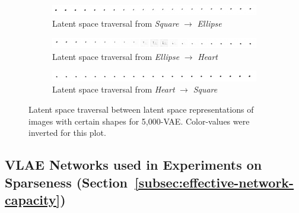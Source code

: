\documentclass[11pt]{article}
\let\oldsection\section
\renewcommand\section{\clearpage\oldsection}
\begin{document}
\begin{figure}[H]
\centering
\begin{subfigure}{\textwidth}
\centering
\includegraphics[width=\textwidth]{images/latent_space_entanglement/vae_5000_traverse_square_ellipse.png}
\caption{Latent space traversal from \textit{Square} $\rightarrow$ \textit{Ellipse}}
\end{subfigure}
\begin{subfigure}{\textwidth}
\centering
\includegraphics[width=\textwidth]{images/latent_space_entanglement/vae_5000_traverse_ellipse_heart.png}
\caption{Latent space traversal from \textit{Ellipse} $\rightarrow$ \textit{Heart}}
\end{subfigure}
\begin{subfigure}{\textwidth}
\centering
\includegraphics[width=\textwidth]{images/latent_space_entanglement/vae_5000_traverse_heart_square.png}
\caption{Latent space traversal from \textit{Heart} $\rightarrow$ \textit{Square}}
\label{subfig:10000_vae_latent_space_traversal_heart_to_square}
\end{subfigure}
\caption[5,000-\ac{VAE} - Latent Space Traversal]{Latent space traversal between latent space representations of images with certain shapes for 5,000-\ac{VAE}. Color-values were inverted for this plot.}
\label{fig:5000_vae_latent_space_traversal_shape_to_shape}
\end{figure}


\pagebreak
\begin{landscape}
\section{\ac{VLAE} Networks used in Experiments on Sparseness (Section~\ref{subsec:effective-network-capacity})}\label{sec:listings_sparsity_networks}

\pagebreak

\pagebreak

\pagebreak

\pagebreak

\pagebreak

\end{landscape}
\end{document}

